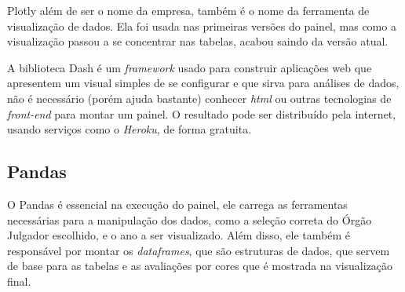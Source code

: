 Plotly além de ser o nome da empresa, também é o nome da ferramenta de visualização de dados. Ela foi usada nas primeiras versões do painel, mas como a visualização passou a se concentrar nas tabelas, acabou saindo da versão atual.

A biblioteca Dash é um \textit{framework} usado para construir aplicações web que apresentem um visual simples de se configurar e que sirva para análises de dados, não é necessário (porém ajuda bastante) conhecer \textit{html} ou outras tecnologias de \textit{front-end} para montar um painel. O resultado pode ser distribuído pela internet, usando serviços como o \textit{Heroku}, de forma gratuita.

\subsection{Pandas}

O Pandas é essencial na execução do painel, ele carrega as ferramentas necessárias para a manipulação dos dados, como a seleção correta do Órgão Julgador escolhido, e o ano a ser visualizado. Além disso, ele também é responsável por montar os \textit{dataframes}, que são estruturas de dados, que servem de base para as tabelas e as avaliações por cores que é mostrada na visualização final.
